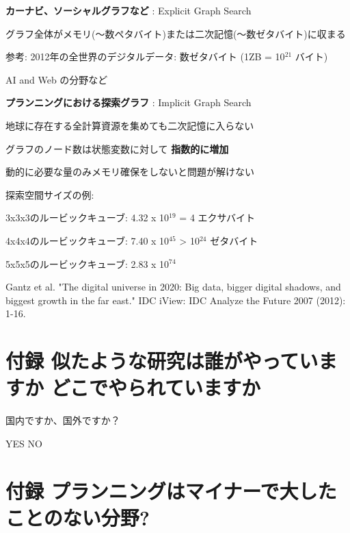 \begin{container-fluid}
\begin{row-fluid}
\begin{span4}
\textbf{カーナビ、ソーシャルグラフなど} : Explicit Graph Search

グラフ全体がメモリ(〜数ペタバイト)または二次記憶(〜数ゼタバイト)に収まる

参考: 2012年の全世界のデジタルデータ: 数ゼタバイト (1ZB = 10$^{\text{21}}$ バイト)

AI and Web の分野など
\end{span4}
\begin{span8}
\textbf{プランニングにおける探索グラフ} : Implicit Graph Search

地球に存在する全計算資源を集めても二次記憶に入らない

グラフのノード数は状態変数に対して \textbf{指数的に増加}

動的に必要な量のみメモリ確保をしないと問題が解けない

探索空間サイズの例:

3x3x3のルービックキューブ: 4.32 x 10$^{\text{19}}$ = 4 エクサバイト

4x4x4のルービックキューブ: 7.40 x 10$^{\text{45}}$ > 10$^{\text{24}}$ ゼタバイト

5x5x5のルービックキューブ: 2.83 x 10$^{\text{74}}$
\end{span8}
\end{row-fluid}
\end{container-fluid}


\begin{note}
Gantz et al. "The digital universe in 2020: Big data, bigger digital shadows, and biggest growth in the far east." IDC iView: IDC Analyze the Future 2007 (2012): 1-16.
\end{note}


\section{付録 似たような研究は誰がやっていますか どこでやられていますか}
\label{sec-14}


\begin{xlarge}
国内ですか、国外ですか？
\begin{center}
YES NO
\end{center}
\end{xlarge}

\section{付録 プランニングはマイナーで大したことのない分野?}
\label{sec-15}

